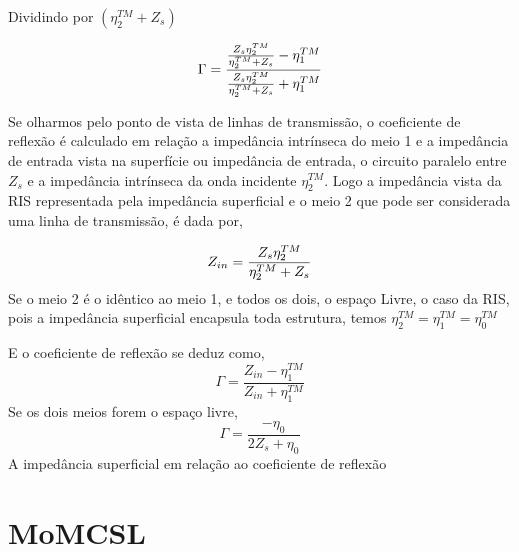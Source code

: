 \documentclass[
	12pt,				%
	openright,			%
	oneside,			%
	a4paper,			%
	english,			%
	brazil				%
	]{abntex2}
\begin{document}
\begin{apendicesenv}
Dividindo por $(\eta_2^{TM}+Z_s) $

\begin{equation}{\label{CoefReflexaoParaleloZsEta2}}
   \Gamma= \frac{\frac{Z_s \eta_2^{TM} }{\eta_2^{TM}+Z_s}-\eta_1^{TM}}
    {\frac{Z_s \eta_2^{TM} }{\eta_2^{TM}+Z_s}+\eta_1^{TM}}
\end{equation}

Se olharmos pelo ponto de vista de linhas de transmissão, o coeficiente de reflexão  é calculado em relação a impedância intrínseca do meio 1 e a impedância de entrada vista na superfície ou impedância de entrada, o circuito paralelo  entre $Z_s$ e a impedância intrínseca da onda incidente $\eta^{TM}_{2}$. Logo a impedância vista da RIS representada pela impedância superficial e o meio 2 que pode ser considerada uma linha de transmissão, é dada por,

\begin{equation}{\label{ImpedanciaZinParaleloZsEta2}}
   Z_{in}= \frac{Z_s \eta_2^{TM} }{\eta_2^{TM}+Z_s}
\end{equation}
Se o meio 2 é o idêntico ao meio 1, e todos os dois, o espaço Livre, o caso da RIS, pois a impedância superficial encapsula toda estrutura, temos $\eta^{TM}_{2}=\eta^{TM}_1=\eta^{TM}_0$

E o coeficiente de reflexão se deduz como,
\begin{equation}
   \Gamma= \frac{Z_{in}-\eta_1^{TM}}
    {Z_{in}+\eta_1^{TM}}
\end{equation}
Se os dois meios forem o espaço livre,
\begin{equation}
    \Gamma=\frac{-\eta_0}{2Z_s+\eta_0}
\end{equation}
A impedância superficial em relação ao coeficiente de reflexão

\chapter{MoMCSL}

\end{apendicesenv}
\end{document}
